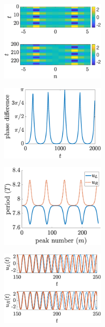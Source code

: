 \documentclass[12pt,reqno]{amsart}
\theoremstyle{definition}
\begin{document}
\begin{figure}
	\begin{center}
	\begin{subfigure}{0.3\linewidth}
		\caption{}
		\includegraphics[width=5.25cm]{timestepN6ppcolormap.eps} \hspace{-0.5cm}
		\label{fig:timestepSGunstablea}
	\end{subfigure}
	\begin{subfigure}{0.3\linewidth}
		\caption{}
		\includegraphics[width=5.25cm]{timestepN6ppphase.eps} \hspace{-0.5cm}
		\label{fig:timestepSGunstableb}
	\end{subfigure}
		\begin{subfigure}{0.3\linewidth}
		\caption{}
		\includegraphics[width=5.25cm]{timestepN6ppperiods.eps} \hspace{-0.5cm}
		\label{fig:timestepSGunstablec}
	\end{subfigure}
	\begin{subfigure}{0.3\linewidth}
		\caption{}
		\includegraphics[width=5.25cm]{timestepN6ppLR.eps} \hspace{-0.5cm}

\end{subfigure}
\end{center}
\end{figure}
\end{document}
